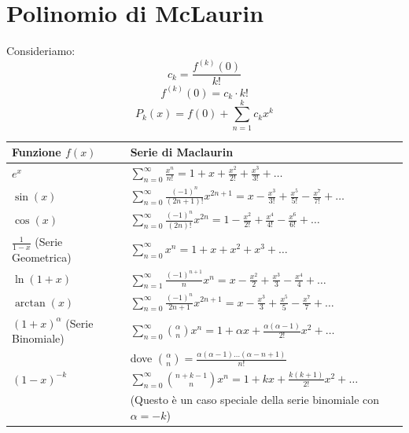 \documentclass[10pt, a4paper]{article}
\begin{document}
\section{Polinomio di McLaurin}
    Consideriamo:
    \begin{equation*}
        c_k = \frac{f^{(k)}(0)}{k!}
    \end{equation*}
    \begin{equation*}
        f^{(k)}(0) = c_k\cdot k!
    \end{equation*}
    \begin{equation*}
        P_k(x)=f(0)+\sum_{n=1}^{k}c_k x^k
    \end{equation*}
    \begin{center}
        \begin{tabular}{|p{4cm}|p{10.5cm}|}
            \hline
            \textbf{Funzione $f(x)$} & \textbf{Serie di Maclaurin} \\
            \hline
            $e^x$ & $\displaystyle \sum_{n=0}^{\infty} \frac{x^n}{n!} = 1 + x + \frac{x^2}{2!} + \frac{x^3}{3!} + \dots$ \\
            \hline
            $\sin(x)$ & $\displaystyle \sum_{n=0}^{\infty} \frac{(-1)^n}{(2n+1)!}x^{2n+1} = x - \frac{x^3}{3!} + \frac{x^5}{5!} - \frac{x^7}{7!} + \dots$ \\
            \hline
            $\cos(x)$ & $\displaystyle \sum_{n=0}^{\infty} \frac{(-1)^n}{(2n)!}x^{2n} = 1 - \frac{x^2}{2!} + \frac{x^4}{4!} - \frac{x^6}{6!} + \dots$ \\
            \hline
            $\frac{1}{1-x}$ (Serie Geometrica) & $\displaystyle \sum_{n=0}^{\infty} x^n = 1 + x + x^2 + x^3 + \dots$ \\
            \hline
            $\ln(1+x)$ & $\displaystyle \sum_{n=1}^{\infty} \frac{(-1)^{n+1}}{n}x^n = x - \frac{x^2}{2} + \frac{x^3}{3} - \frac{x^4}{4} + \dots$ \\
            \hline
            $\arctan(x)$ & $\displaystyle \sum_{n=0}^{\infty} \frac{(-1)^n}{2n+1}x^{2n+1} = x - \frac{x^3}{3} + \frac{x^5}{5} - \frac{x^7}{7} + \dots$ \\
            \hline
            $(1+x)^\alpha$ (Serie Binomiale) & $\displaystyle \sum_{n=0}^{\infty} \binom{\alpha}{n}x^n = 1 + \alpha x + \frac{\alpha(\alpha-1)}{2!}x^2 + \dots$ \\
            & \quad dove $\binom{\alpha}{n} = \frac{\alpha(\alpha-1)\dots(\alpha-n+1)}{n!}$ \\
            \hline
            $(1-x)^{-k}$ & $\displaystyle \sum_{n=0}^{\infty} \binom{n+k-1}{n}x^n = 1 + kx + \frac{k(k+1)}{2!}x^2 + \dots$ \\
            & (Questo è un caso speciale della serie binomiale con $\alpha = -k$) \\
            \hline
        \end{tabular}
    \end{center}
    \newpage
\end{document}
